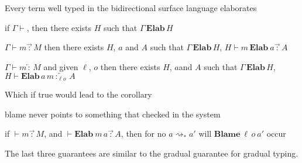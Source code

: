 \begin{conjecture}
Every term well typed in the bidirectional surface language elaborates
 
if $\Gamma\vdash$, then there exists $H$ such that $\Gamma\,\textbf{Elab}\,H$
 
$\Gamma\vdash m\overrightarrow{\,:\,}M$ then there exists $H$, $a$ and $A$ such that $\Gamma\,\textbf{Elab}\,H$, $H\vdash m\,\textbf{Elab}\ a\overrightarrow{\,:\,}A$
 
$\Gamma\vdash m\overleftarrow{\,:\,}M$ and given $\ell$, $o$ then there exists $H$, $a$and $A$ such that $\Gamma\,\textbf{Elab}\,H$, $H\vdash\textbf{Elab}\,a\,m\overleftarrow{\,:_{\ell o}\,}A$
\end{conjecture}
 
Which if true would lead to the corollary
\begin{conjecture}
blame never points to something that checked in the \bidir{} system
 
if $\vdash m\overrightarrow{\,:\,}M$, and $\vdash\textbf{Elab}\ m\,a\overrightarrow{\,:\,}A$, then for no $a\rightsquigarrow_{*}a'$ will $\textbf{Blame}\:\ensuremath{\ell}\,o\:a'$ occur
 
\end{conjecture}
 
The last three guarantees are similar to the gradual guarantee \cite{siek_et_al:LIPIcs:2015:5031} for gradual typing.